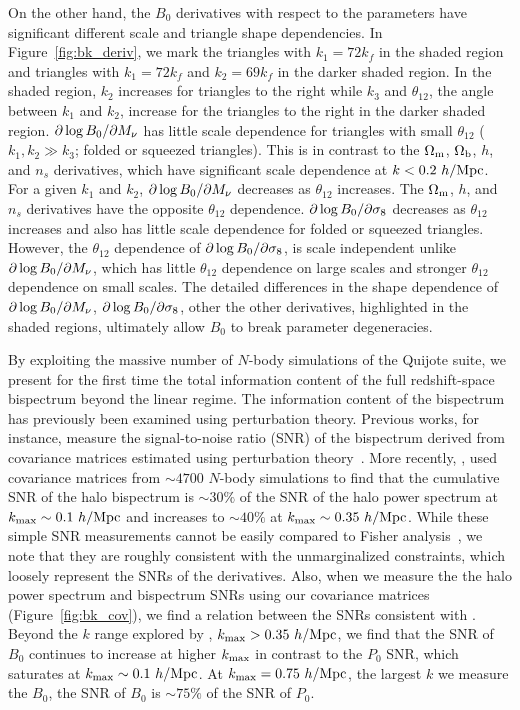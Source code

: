 On the other hand, the $B_0$ derivatives with respect to the parameters 
have significant different scale and triangle shape dependencies.
In Figure~\ref{fig:bk_deriv}, we mark the triangles with $k_1 = 72 k_f$ in the 
shaded region and triangles with $k_1 = 72 k_f$ and $k_2 = 69 k_f$ in the darker 
shaded region. In the shaded region, $k_2$ increases for triangles to the right 
while $k_3$ and $\theta_{12}$, the angle between $k_1$ and $k_2$, increase for 
the triangles to the right in the darker shaded region. $\partial \log B_0/\partial M_\nu$
has little scale dependence for triangles with small $\theta_{12}$ 
($k_1, k_2 \gg k_3$; folded or squeezed triangles). This is in contrast to the 
$\Omega_{\rm m}$, $\Omega_{\rm b}$, $h$, and $n_s$ derivatives, which have significant scale dependence 
at $k < 0.2~h/{\rm Mpc}$. For a given $k_1$ and $k_2$, $\partial \log B_0/\partial M_\nu$
decreases as $\theta_{12}$ increases. The $\Omega_{\rm m}$, $h$, and $n_s$ derivatives have 
the opposite $\theta_{12}$ dependence. $\partial \log B_0/\partial \sigma_8$
decreases as $\theta_{12}$ increases and also has little scale dependence for 
folded or squeezed triangles. However, the $\theta_{12}$ dependence of 
$\partial \log B_0/\partial \sigma_8$, is scale independent unlike $\partial \log B_0/\partial M_\nu$,
which has little $\theta_{12}$ dependence on large scales and stronger $\theta_{12}$ 
dependence on small scales. The detailed differences in the shape dependence of 
$\partial \log B_0/\partial M_\nu$, $\partial \log B_0/\partial \sigma_8$, other the 
other derivatives, highlighted in the shaded regions, ultimately allow $B_0$ 
to break parameter degeneracies. 

By exploiting the massive number of $N$-body simulations of the Quijote 
suite, we present for the first time the total information content of the 
full redshift-space bispectrum beyond the linear regime. The information content 
of the bispectrum has previously been examined using perturbation 
theory. Previous works, for instance, measure the signal-to-noise ratio (SNR) 
of the bispectrum derived from covariance matrices estimated using perturbation 
theory~\citep{sefusatti2005, sefusatti2006, chan2017}. More recently, \cite{chan2017},
used covariance matrices from %
$\sim 4700$ $N$-body simulations to find that the cumulative SNR of the halo bispectrum is 
$\sim 30\%$ of the SNR of the halo power spectrum at $k_{\rm max} \sim 0.1~h/{\rm Mpc}$ 
and increases to $\sim 40\%$ at $k_{\rm max}\sim 0.35~h/{\rm Mpc}$. While these simple 
SNR measurements cannot be easily compared to Fisher analysis~\citep{repp2015, blot2016}, 
we note that they are roughly consistent with the unmarginalized constraints, 
which loosely represent the SNRs of the derivatives. 
Also, when we measure the the halo power spectrum and bispectrum SNRs using our 
covariance matrices (Figure~\ref{fig:bk_cov}), we find a relation between the 
SNRs consistent with \cite{chan2017}. Beyond the $k$ range explored by \cite{chan2017},  
$k_{\rm max}>0.35~h/{\rm Mpc}$, we find that the SNR of $B_0$ continues to increase 
at higher $k_{\rm max}$ in contrast to the $P_0$ SNR, which saturates at 
$k_{\rm max}\sim 0.1~h/{\rm Mpc}$. At $k_{\rm max} = 0.75~h/{\rm Mpc}$, the largest $k$ we 
measure the $B_0$, the SNR of $B_0$ is $\sim75\%$ of the SNR of $P_0$.

